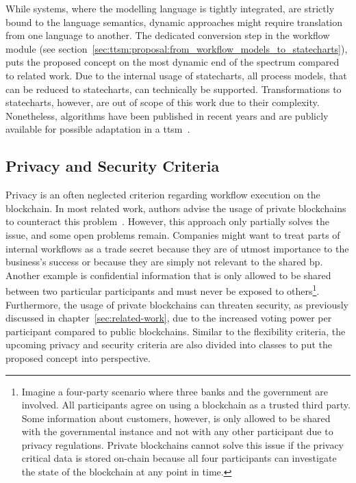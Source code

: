 While systems, where the modelling language is tightly integrated, are strictly bound to the language semantics, dynamic approaches might require translation from one language to another. The dedicated conversion step in the workflow module (see section~\ref{sec:ttsm:proposal:from_workflow_models_to_statecharts}), puts the proposed concept on the most dynamic end of the spectrum compared to related work. Due to the internal usage of statecharts, all process models, that can be reduced to statecharts, can technically be supported. Transformations to statecharts, however, are out of scope of this work due to their complexity. Nonetheless, algorithms have been published in recent years and are publicly available for possible adaptation in a \gls{ttsm}~\cite{inter_organizational_bps_managed_by_blockchain,sequence_diagrams_to_statecharts}.


\subsection{Privacy and Security Criteria}
\label{sec:evaluation:qualitative_analysis:privacy_criteria}
Privacy is an often neglected criterion regarding workflow execution on the blockchain. In most related work, authors advise the usage of private blockchains to counteract this problem~\cite{untrusted_bp_execution_using_blockchain,bo_collaboration_between_healthcare_providers_covid_19,blockchain_based_information_sharing_in_io_workflows,lean_architecture_for_blockchain_based_process_execution,data_driven_choreography_data_reusability_lichtenstein,interpreted_bp_on_blockchain_loukil}. However, this approach only partially solves the issue, and some open problems remain. Companies might want to treat parts of internal workflows as a trade secret because they are of utmost importance to the business's success or because they are simply not relevant to the shared \gls{bp}. Another example is confidential information that is only allowed to be shared between two particular participants and must never be exposed to others\footnote{Imagine a four-party scenario where three banks and the government are involved. All participants agree on using a blockchain as a trusted third party. Some information about customers, however, is only allowed to be shared with the governmental instance and not with any other participant due to privacy regulations. Private blockchains cannot solve this issue if the privacy critical data is stored on-chain because all four participants can investigate the state of the blockchain at any point in time.}. Furthermore, the usage of private blockchains can threaten security, as previously discussed in chapter~\ref{sec:related-work}, due to the increased voting power per participant compared to public blockchains. Similar to the flexibility criteria, the upcoming privacy and security criteria are also divided into classes to put the proposed concept into perspective.

